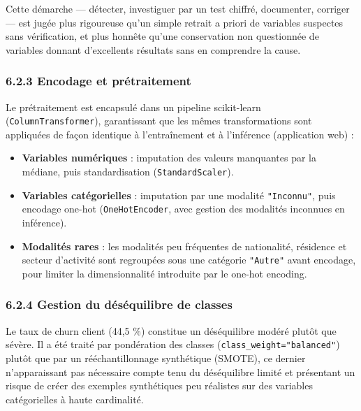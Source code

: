 \documentclass[11pt,a4paper]{article}
\providecommand{\tightlist}{\setlength{\itemsep}{0pt}\setlength{\parskip}{0pt}}
\begin{document}
Cette démarche --- détecter, investiguer par un test chiffré,
documenter, corriger --- est jugée plus rigoureuse qu'un simple retrait
a priori de variables suspectes sans vérification, et plus honnête
qu'une conservation non questionnée de variables donnant d'excellents
résultats sans en comprendre la cause.

\hypertarget{encodage-et-pruxe9traitement}{%
\subsubsection{6.2.3 Encodage et
prétraitement}\label{encodage-et-pruxe9traitement}}

Le prétraitement est encapsulé dans un pipeline scikit-learn
(\texttt{ColumnTransformer}), garantissant que les mêmes transformations
sont appliquées de façon identique à l'entraînement et à l'inférence
(application web) :

\begin{itemize}
\tightlist
\item
  \textbf{Variables numériques} : imputation des valeurs manquantes par
  la médiane, puis standardisation (\texttt{StandardScaler}).
\item
  \textbf{Variables catégorielles} : imputation par une modalité
  \texttt{"Inconnu"}, puis encodage one-hot (\texttt{OneHotEncoder},
  avec gestion des modalités inconnues en inférence).
\item
  \textbf{Modalités rares} : les modalités peu fréquentes de
  nationalité, résidence et secteur d'activité sont regroupées sous une
  catégorie \texttt{"Autre"} avant encodage, pour limiter la
  dimensionnalité introduite par le one-hot encoding.
\end{itemize}

\hypertarget{gestion-du-duxe9suxe9quilibre-de-classes}{%
\subsubsection{6.2.4 Gestion du déséquilibre de
classes}\label{gestion-du-duxe9suxe9quilibre-de-classes}}

Le taux de churn client (44,5 \%) constitue un déséquilibre modéré
plutôt que sévère. Il a été traité par pondération des classes
(\texttt{class\_\hspace{0pt}weight="balanced"}) plutôt que par un
rééchantillonnage synthétique (SMOTE), ce dernier n'apparaissant pas
nécessaire compte tenu du déséquilibre limité et présentant un risque de
créer des exemples synthétiques peu réalistes sur des variables
catégorielles à haute cardinalité.
\end{document}
